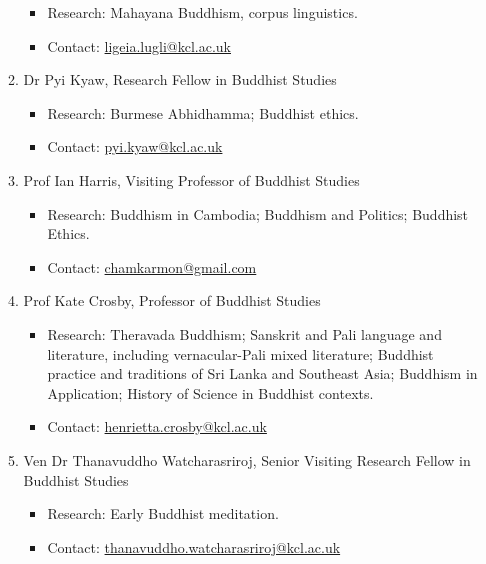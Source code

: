 \documentclass[a4paper,10.5pt]{article}
\begin{document}
\begin{enumerate}
\begin{enumerate}
\begin{itemize}
\item Research: Mahayana Buddhism, corpus linguistics.\\
\item Contact: \href{mailto:ligeia.lugli@kcl.ac.uk}{ligeia.lugli@kcl.ac.uk}\\
\end{itemize}
\item Dr Pyi Kyaw, Research Fellow in Buddhist Studies
\label{sec:org0c81f87}
\begin{itemize}
\item Research: Burmese Abhidhamma; Buddhist ethics.\\
\item Contact: \href{mailto:pyi.kyaw@kcl.ac.uk}{pyi.kyaw@kcl.ac.uk}\\
\end{itemize}
\item Prof Ian Harris, Visiting Professor of Buddhist Studies
\label{sec:org4780db8}
\begin{itemize}
\item Research: Buddhism in Cambodia; Buddhism and Politics; Buddhist Ethics.\\
\item Contact: \href{mailto:chamkarmon@gmail.com}{chamkarmon@gmail.com}\\
\end{itemize}
\item Prof Kate Crosby, Professor of Buddhist Studies
\label{sec:org6968ed5}
\begin{itemize}
\item Research: Theravada Buddhism; Sanskrit and Pali language and literature, including vernacular-Pali mixed literature; Buddhist practice and traditions of Sri Lanka and Southeast Asia; Buddhism in Application; History of Science in Buddhist contexts.\\
\item Contact: \href{mailto:henrietta.crosby@kcl.ac.uk}{henrietta.crosby@kcl.ac.uk}\\
\end{itemize}
\item Ven Dr Thanavuddho Watcharasriroj, Senior Visiting Research Fellow in Buddhist Studies
\label{sec:org089ce2f}
\begin{itemize}
\item Research: Early Buddhist meditation.\\
\item Contact: \href{mailto:thanavuddho.watcharasriroj@kcl.ac.uk}{thanavuddho.watcharasriroj@kcl.ac.uk}\\
\end{itemize}
\end{enumerate}
\end{enumerate}
\end{document}
